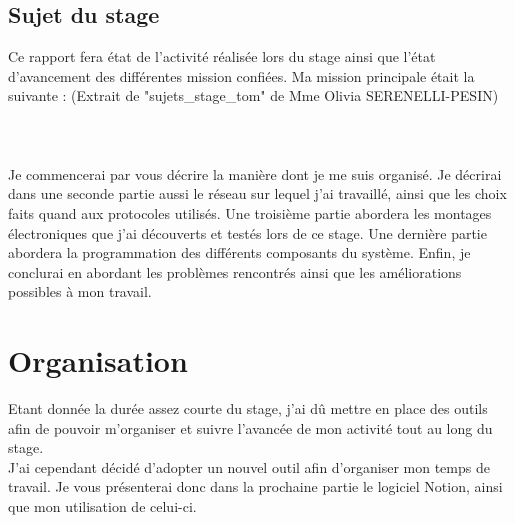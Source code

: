 \documentclass[12pt,french,a4paper]{article}
\begin{document}
\subsection{Sujet du stage}
Ce rapport fera état de l'activité réalisée lors du stage ainsi que l'état d'avancement des différentes mission confiées. Ma mission principale était la suivante : (Extrait de "sujets\_stage\_tom" de Mme Olivia SERENELLI-PESIN) 
\\
\\
\\
\\
Je commencerai par vous décrire la manière dont je me suis organisé. Je décrirai dans une seconde partie aussi le réseau sur lequel j'ai travaillé, ainsi que les choix faits quand aux protocoles utilisés. Une troisième partie abordera les montages électroniques que j'ai découverts et testés lors de ce stage. Une dernière partie abordera la programmation des différents composants du système. Enfin, je conclurai en abordant les problèmes rencontrés ainsi que les améliorations possibles à mon travail.

\newpage
\section{Organisation}
Etant donnée la durée assez courte du stage, j'ai dû mettre en place des outils afin de pouvoir m'organiser et suivre l'avancée de mon activité tout au long du stage.
\\
J'ai cependant décidé d'adopter un nouvel outil afin d'organiser mon temps de travail. Je vous présenterai donc dans la prochaine partie le logiciel Notion, ainsi que mon utilisation de celui-ci.
\end{document}
